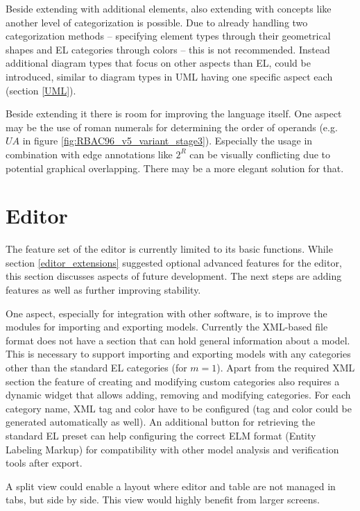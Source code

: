 \documentclass[twoside, openright, 12pt]{book}
\begin{document}
\noindent
Beside extending with additional elements, also extending with concepts like another level of categorization is possible.
Due to already handling two categorization methods -- specifying element types through their geometrical shapes and EL categories through colors -- this is not recommended.
Instead additional diagram types that focus on other aspects than EL, could be introduced, similar to diagram types in UML having one specific aspect each (section \ref{UML}).

Beside extending it there is room for improving the language itself.
One aspect may be the use of roman numerals for determining the order of operands (e.g.\ $\mathit{UA}$ in figure \ref{fig:RBAC96_v5_variant_stage3}).
Especially the usage in combination with edge annotations like $2^R$ can be visually conflicting due to potential graphical overlapping.
There may be a more elegant solution for that.



\section{Editor}
\label{future_editor}
The feature set of the editor is currently limited to its basic functions.
While section \ref{editor_extensions} suggested optional advanced features for the editor, this section discusses aspects of future development.
The next steps are adding features as well as further improving stability.

One aspect, especially for integration with other software, is to improve the modules for importing and exporting models.
Currently the XML-based file format does not have a section that can hold general information about a model.
This is necessary to support importing and exporting models with any categories other than the standard EL categories (for $m=1$).
Apart from the required XML section the feature of creating and modifying custom categories also requires a dynamic widget that allows adding, removing and modifying categories. 
For each category name, XML tag and color have to be configured (tag and color could be generated automatically as well).
An additional button for retrieving the standard EL preset can help configuring the correct ELM format (Entity Labeling Markup) for compatibility with other model analysis and verification tools after export.

A split view could enable a layout where editor and table are not managed in tabs, but side by side.
This view would highly benefit from larger screens.
\end{document}
